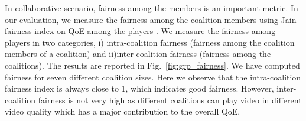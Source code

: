 In collaborative scenario, fairness among the members is an important metric. In our evaluation, we measure the fairness among the coalition members using Jain fairness index on QoE among the players \cite{jain1999throughput}. We measure the fairness among players in two categories, i) intra-coalition fairness (fairness among the coalition members of a coalition) and ii)inter-coalition fairness (fairness among the coalitions). The results are reported in Fig.~\ref{fig:grp_fairness}. We have computed fairness for seven different coalition sizes. Here we observe that the intra-coalition fairness index is always close to 1, which indicates good fairness. However, inter-coalition fairness is not very high as different coalitions can play video in different video quality which has a major contribution to the overall QoE. 
